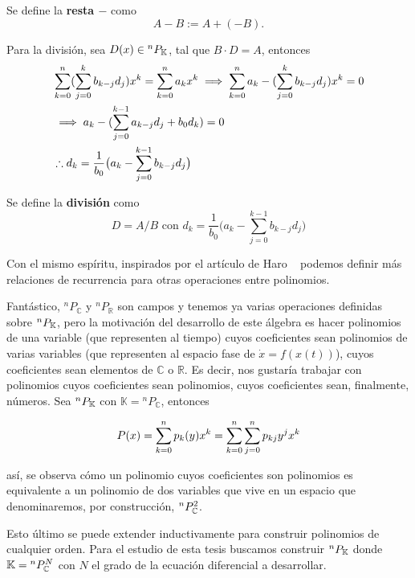 Se define la \textbf{resta $-$} como
\begin{equation}
 A - B := A + (-B).
 \label{eq:polisub}
\end{equation}


Para la división, sea $D(x) \in {^{n}P_{\mathbb{K}}}$, tal que  $B \cdot D = A $,  entonces 
\begin{align*}
 & \sum_{k=0}^n  (\sum_{j=0}^k b_{k-j} d_j )  x^k = \sum_{k=0}^n  a_k  x^k \implies \sum_{k=0}^n  a_k - (\sum_{j=0}^k b_{k-j} d_j )  x^k = 0 \\ 
 &\implies a_k - ( \sum_{j=0}^{k-1}a_{k-j} d_j + b_0 d_k ) = 0 \\
 & \therefore d_k = \frac{1}{b_0} \big( a_k - \sum_{j=0}^{k-1} b_{k-j} d_j \big)  
\end{align*}

Se define la \textbf{división} como
\begin{equation}
 D = A/B \text{ con } d_k = \frac{1}{b_0} \big( a_k - \sum_{j=0}^{k-1} b_{k-j} d_j \big)
 \label{eq:polidiv}
\end{equation}

Con el mismo espíritu, inspirados por el artículo de Haro ~\cite{Haro2009} podemos definir más relaciones de recurrencia para otras operaciones entre polinomios.


Fantástico, $^nP_{\mathbb{C}}$ y $^nP_{\mathbb{R}}$ son campos y tenemos ya varias operaciones definidas sobre ${^{n}P_{\mathbb{K}}}$, pero la motivación del desarrollo de este álgebra es hacer polinomios de una variable (que representen al tiempo) cuyos coeficientes sean polinomios de varias variables (que representen al espacio fase de $\dot{x} = f(x(t))$), cuyos coeficientes sean elementos de $\mathbb{C}$ o $\mathbb{R}$. Es decir, nos gustaría trabajar con polinomios cuyos coeficientes sean polinomios, cuyos coeficientes sean, finalmente, números.
Sea  ${^{n}P_{\mathbb{K}}}$ con $\mathbb{K} = {{^{n}P_{\mathbb{C}}}}$, entonces

\begin{align*}
 P(x) = \sum_{k=0}^n p_k(y) x^k = \sum_{k=0}^n \sum_{j=0}^n p_{kj} y^j x^k
\end{align*}

así, se observa cómo un polinomio cuyos coeficientes son polinomios es equivalente a un polinomio de dos variables que vive en un espacio que denominaremos, por construcción, ${^{n}P_{\mathbb{C}}^ 2 }$.

Esto último se puede extender inductivamente para construir polinomios de cualquier orden. Para el estudio de esta tesis buscamos construir ${^{n}P_{\mathbb{K}}}$ donde $\mathbb{K} = {^{n}P_{\mathbb{C}}^ N }$ con $N$ el grado de la ecuación diferencial a desarrollar.

